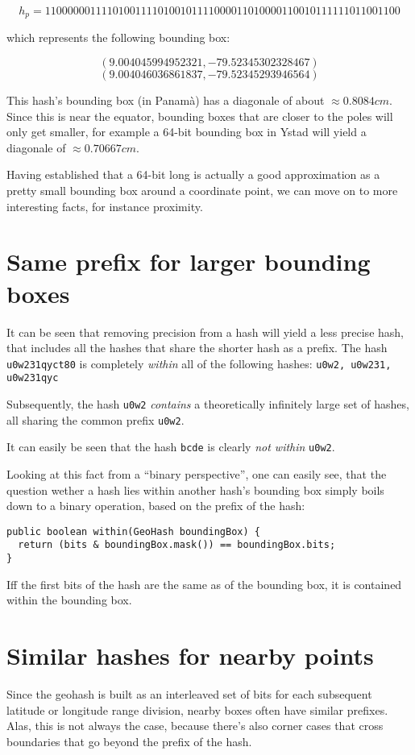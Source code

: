 \documentclass[a4paper,11pt,twoside]{scrartcl}
\begin{document}
\[
h_p = 110000001111010011110100101111000011010000110010111111011001100
\]

which represents the following bounding box:

\[
(9.004045994952321,-79.52345302328467)
\]
\[
(9.004046036861837,-79.52345293946564)
\]

This hash's bounding box (in Panamà) has a diagonale of about $\approx 0.8084 cm$. Since this is near the equator, bounding boxes that are closer to the poles will only get smaller, for example a 64-bit bounding box in Ystad will yield a diagonale of $\approx 0.70667 cm$.

Having established that a 64-bit long is actually a good approximation as a pretty small bounding box around a coordinate point, we can move on to more interesting facts, for instance proximity.


\section{Same prefix for larger bounding boxes} %
\label{sec:same_prefix_for_larger_bounding_boxes}
It can be seen that removing precision from a hash will yield a less precise hash, that includes all the hashes that share the shorter hash as a prefix.
The hash \texttt{u0w231qyct80} is completely \emph{within} all of the following hashes: \texttt{u0w2, u0w231, u0w231qyc}

Subsequently, the hash \texttt{u0w2} \emph{contains} a theoretically infinitely large set of hashes, all sharing the common prefix \texttt{u0w2}.

It can easily be seen that the hash \texttt{bcde} is clearly \emph{not within} \texttt{u0w2}.

Looking at this fact from a “binary perspective”, one can easily see, that the question wether a hash lies within another hash's bounding box simply boils down to a binary operation, based on the prefix of the hash:

\begin{lstlisting}
public boolean within(GeoHash boundingBox) {
  return (bits & boundingBox.mask()) == boundingBox.bits;
}
\end{lstlisting}

Iff the first bits of the hash are the same as of the bounding box, it is contained within the bounding box.



\section{Similar hashes for nearby points} %
\label{sec:similar_hashes_for_nearby_pojnts}
Since the geohash is built as an interleaved set of bits for each subsequent latitude or longitude range division, nearby boxes often have similar prefixes. Alas, this is not always the case, because there's also corner cases that cross boundaries that go beyond the prefix of the hash.
\end{document}

